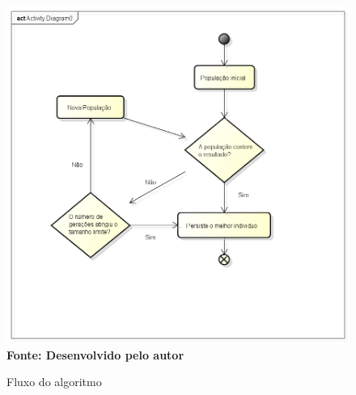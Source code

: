 \begin{figure}[!htb]
\caption[Fluxo do algoritmo]{Fluxo do algoritmo}
\label{fig:fluxoAlgoritmo}
\centering
\includegraphics[scale=0.7]{imagens/fluxoAlgoritimo.png}
\\ \textbf{\footnotesize Fonte: Desenvolvido pelo autor}
\end{figure}